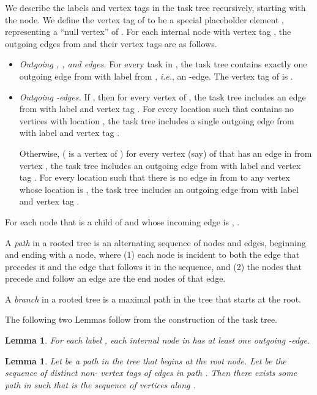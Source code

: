 \documentclass[11pt]{article}
\numberwithin{theorem}{section}
\newtheorem{lemma}[theorem]{Lemma}
\begin{document}
We describe the labels and vertex tags in the task tree recursively,
starting with the  node. 
We define the vertex tag of  to be a special placeholder element
, representing a ``null vertex'' of .
For each internal node  with vertex tag , the outgoing edges
from  and their vertex tags are as follows.
\begin{itemize}
\item
\emph{Outgoing , , and  edges.}
For every task  in , the task tree contains exactly one outgoing
edge  from  with label  from , \textit{i.e.}, an -edge. 
The vertex tag  of  is . 
\item
\emph{Outgoing -edges.} 
If , then for every vertex  of , the task tree includes an edge  from  with label  and vertex tag . 
For every location  such that  contains no vertices with location , the task tree includes a single outgoing edge  from  with label  and vertex tag .

Otherwise, ( is a vertex of ) for every vertex (say)  of  that has an edge in  from
vertex , the task tree includes an outgoing edge  from  with
label  and vertex tag . 
For every location  such that there is no edge in  from  to
any vertex whose location is , the task tree includes an outgoing edge
 from  with label  and vertex tag .
\end{itemize}
For each node  that is a child of  and whose incoming edge is
, .

A \emph{path} in a rooted tree is an alternating sequence of nodes and edges,
  beginning and ending with a node, where (1) each node is incident to
  both the edge that precedes it and the edge that follows it in the
  sequence, and (2) the nodes that precede and follow an edge are the
  end nodes of that edge.
  
A \emph{branch} in a rooted tree is a maximal path in the tree that starts at the root. 


The following two Lemmas follow from the construction of the task tree.
\begin{lemma}\label{prop:allLabelsExist}
For each label , each internal node  in  has at
least one outgoing -edge.
\end{lemma}


\begin{lemma}
Let  be a path in the tree that begins at the root node.
Let  be the sequence of distinct non- vertex tags of edges in path .
Then there exists some path  in  such that  is the sequence of vertices along .
\end{lemma}
\end{document}
